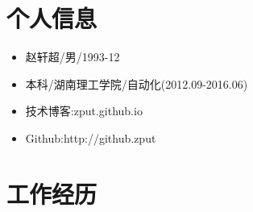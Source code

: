 \documentclass{resume}
\begin{document}


 
\section{个人信息}
\begin{itemize}[parsep=0.2ex]
  \item 赵轩超/男/1993-12
  \item 本科/湖南理工学院/自动化(2012.09-2016.06)
  \item 技术博客:zput.github.io
  \item Github:http://github.zput
\end{itemize}

\section{工作经历}
\end{document}
